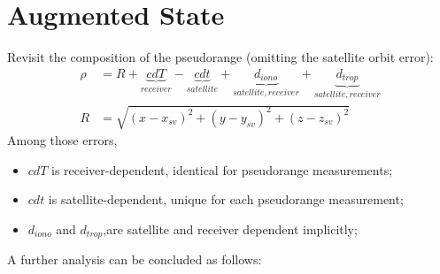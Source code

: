 \documentclass[a4paper]{report}
\begin{document}
\section{Augmented State}
Revisit the composition of the pseudorange (omitting the satellite orbit error):
\begin{align}
\rho &= R + \underbrace{cdT}_{receiver} - \underbrace{cdt}_{satellite} + \underbrace{d_{iono}}_{satellite, receiver} + \underbrace{d_{trop}}_{satellite, receiver} \\
R &= \sqrt{(x-x_{sv})^2+(y-y_{sv})^2+(z-z_{sv})^2}
\end{align}
Among those errors, 
\begin{itemize}
\item $cdT$ is receiver-dependent, identical for pseudorange measurements;
\item $cdt$ is satellite-dependent, unique for each pseudorange measurement;
\item $d_{iono}$ and $d_{trop}$,are satellite and receiver dependent implicitly;
\end{itemize}
A further analysis can be concluded as follows:
\end{document}
